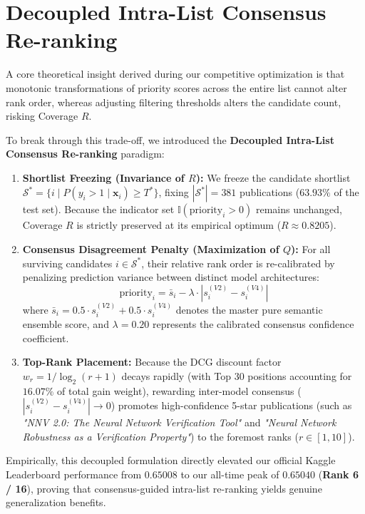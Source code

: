\section{Decoupled Intra-List Consensus Re-ranking}
\label{sec:consensus_rerank}
A core theoretical insight derived during our competitive optimization is that monotonic transformations of priority scores across the entire list cannot alter rank order, whereas adjusting filtering thresholds alters the candidate count, risking Coverage $R$. 

To break through this trade-off, we introduced the \textbf{Decoupled Intra-List Consensus Re-ranking} paradigm:
\begin{enumerate}
  \item \textbf{Shortlist Freezing (Invariance of $R$):} We freeze the candidate shortlist $\mathcal{S}^* = \{i \mid P(y_i > 1 \mid \bm{x}_i) \ge T^*\}$, fixing $|\mathcal{S}^*| = 381$ publications ($63.93\%$ of the test set). Because the indicator set $\mathbb{I}(\text{priority}_i > 0)$ remains unchanged, Coverage $R$ is strictly preserved at its empirical optimum ($R \approx 0.8205$).
  \item \textbf{Consensus Disagreement Penalty (Maximization of $Q$):} For all surviving candidates $i \in \mathcal{S}^*$, their relative rank order is re-calibrated by penalizing prediction variance between distinct model architectures:
  \begin{equation}
    \text{priority}_i = \bar{s}_i - \lambda \cdot \left| s_i^{(V2)} - s_i^{(V4)} \right|
    \label{eq:consensus_rerank}
  \end{equation}
  where $\bar{s}_i = 0.5 \cdot s_i^{(V2)} + 0.5 \cdot s_i^{(V4)}$ denotes the master pure semantic ensemble score, and $\lambda = 0.20$ represents the calibrated consensus confidence coefficient.
  \item \textbf{Top-Rank Placement:} Because the DCG discount factor $w_r = 1/\log_2(r+1)$ decays rapidly (with Top 30 positions accounting for $16.07\%$ of total gain weight), rewarding inter-model consensus ($|s_i^{(V2)} - s_i^{(V4)}| \to 0$) promotes high-confidence 5-star publications (such as \textit{"NNV 2.0: The Neural Network Verification Tool"} and \textit{"Neural Network Robustness as a Verification Property"}) to the foremost ranks ($r \in [1, 10]$).
\end{enumerate}
Empirically, this decoupled formulation directly elevated our official Kaggle Leaderboard performance from $0.65008$ to our all-time peak of $\mathbf{0.65040}$ (\textbf{Rank 6 / 16}), proving that consensus-guided intra-list re-ranking yields genuine generalization benefits.


